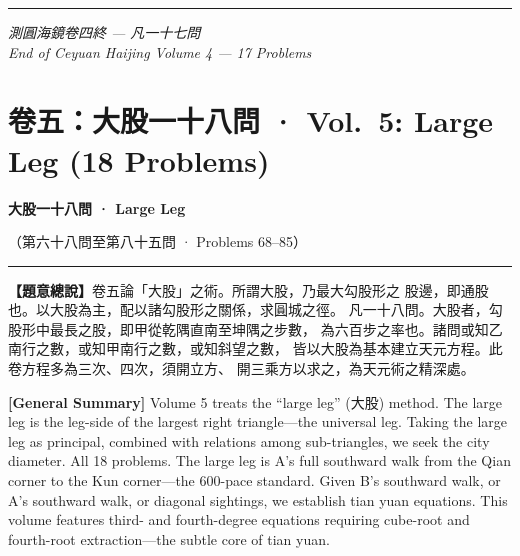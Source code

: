 \documentclass[9pt,a4paper]{article}
\newcommand{\longline}{\noindent\rule{\textwidth}{0.4pt}}
\begin{document}
\vspace{0.4cm}
\longline
\begin{center}
\textit{測圓海鏡卷四終 --- 凡一十七問}\\[0.2cm]
\textit{End of Ceyuan Haijing Volume 4 --- 17 Problems}
\end{center}

\newpage

\section{卷五：大股一十八問 · Vol.\ 5: Large Leg (18 Problems)}
\label{sec:vol5}

\begin{center}
{\Large\bfseries\color{volcolor} 大股一十八問 · Large Leg}

\vspace{0.2cm}

{\small\color{notecolor} （第六十八問至第八十五問 · Problems 68--85）}
\end{center}

\vspace{0.2cm}
\longline
\vspace{0.2cm}

\noindent\begin{minipage}[t]{0.48\textwidth}
\noindent
\textbf{【題意總說】}卷五論「大股」之術。所謂大股，乃最大勾股形之
股邊，即通股也。以大股為主，配以諸勾股形之關係，求圓城之徑。
凡一十八問。大股者，勾股形中最長之股，即甲從乾隅直南至坤隅之步數，
為六百步之率也。諸問或知乙南行之數，或知甲南行之數，或知斜望之數，
皆以大股為基本建立天元方程。此卷方程多為三次、四次，須開立方、
開三乘方以求之，為天元術之精深處。
\end{minipage}%
\hfill%
\begin{minipage}[t]{0.50\textwidth}
\noindent
\textbf{[General Summary]} Volume 5 treats the ``large leg'' (大股) method.
The large leg is the leg-side of the largest right triangle---the universal
leg. Taking the large leg as principal, combined with relations among
sub-triangles, we seek the city diameter. All 18 problems. The large leg
is A's full southward walk from the Qian corner to the Kun corner---the
600-pace standard. Given B's southward walk, or A's southward walk, or
diagonal sightings, we establish tian yuan equations. This volume features
third- and fourth-degree equations requiring cube-root and fourth-root
extraction---the subtle core of tian yuan.
\end{minipage}
\vspace{0.15cm}
\end{document}
